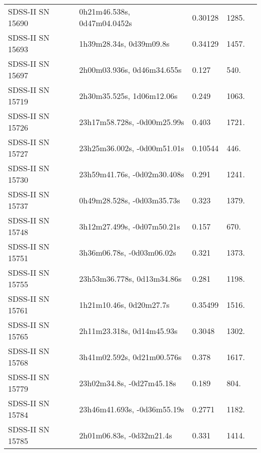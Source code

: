 \begin{longtable}{lllll}
 SDSS-II SN 15690 &    0h21m46.538s, 0d47m04.0452s &  0.30128 &          1285. &    \citet{2016SDSSD.C...0000:} \\
 SDSS-II SN 15693 &        1h39m28.34s, 0d39m09.8s &  0.34129 &          1457. &    \citet{2016SDSSD.C...0000:} \\
 SDSS-II SN 15697 &     2h00m03.936s, 0d46m34.655s &    0.127 &           540. &    \citet{2011ApJ...738..162S} \\
 SDSS-II SN 15719 &      2h30m35.525s, 1d06m12.06s &    0.249 &          1063. &    \citet{2010ApJ...713.1026D} \\
 SDSS-II SN 15726 &    23h17m58.728s, -0d00m25.99s &    0.403 &          1721. &    \citet{2011ApJ...738..162S} \\
 SDSS-II SN 15727 &    23h25m36.002s, -0d00m51.01s &  0.10544 &           446. &    \citet{2003SDSS1.C...0000:} \\
 SDSS-II SN 15730 &    23h59m41.76s, -0d02m30.408s &    0.291 &          1241. &    \citet{2011ApJ...738..162S} \\
 SDSS-II SN 15737 &     0h49m28.528s, -0d03m35.73s &    0.323 &          1379. &    \citet{2011ApJ...738..162S} \\
 SDSS-II SN 15748 &     3h12m27.499s, -0d07m50.21s &    0.157 &           670. &    \citet{2010ApJ...713.1026D} \\
 SDSS-II SN 15751 &      3h36m06.78s, -0d03m06.02s &    0.321 &          1373. &    \citet{2011ApJ...738..162S} \\
 SDSS-II SN 15755 &     23h53m36.778s, 0d13m34.86s &    0.281 &          1198. &    \citet{2011ApJ...738..162S} \\
 SDSS-II SN 15761 &        1h21m10.46s, 0d20m27.7s &  0.35499 &          1516. &    \citet{2016SDSSD.C...0000:} \\
 SDSS-II SN 15765 &      2h11m23.318s, 0d14m45.93s &   0.3048 &          1302. &    \citet{2011ApJ...738..162S} \\
 SDSS-II SN 15768 &     3h41m02.592s, 0d21m00.576s &    0.378 &          1617. &    \citet{2011ApJ...738..162S} \\
 SDSS-II SN 15779 &      23h02m34.8s, -0d27m45.18s &    0.189 &           804. &    \citet{2011ApJ...738..162S} \\
 SDSS-II SN 15784 &    23h46m41.693s, -0d36m55.19s &   0.2771 &          1182. &    \citet{2011ApJ...738..162S} \\
 SDSS-II SN 15785 &       2h01m06.83s, -0d32m21.4s &    0.331 &          1414. &    \citet{2010ApJ...713.1026D} \\

\end{longtable}
